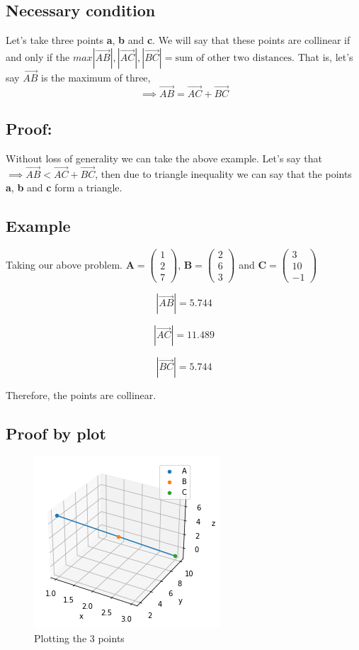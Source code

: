 \documentclass[journal,12pt,twocolumn]{IEEEtran}
\begin{document}
\subsection{Necessary condition}
Let's take three points \textbf{a}, \textbf{b} and \textbf{c}. We will say that these points are collinear if and only if the $max{|\overrightarrow{AB}|, |\overrightarrow{AC}|, |\overrightarrow{BC}|} = 
\text{sum of other two distances}$. That is, let's say $\overrightarrow{AB}$ is the maximum of three, 
$$\implies \overrightarrow{AB} = \overrightarrow{AC} + \overrightarrow{BC}$$
\subsection{Proof:}
Without loss of generality we can take the above example. Let's say that $\implies \overrightarrow{AB} < \overrightarrow{AC} + \overrightarrow{BC}$, then due to triangle inequality we can say that 
the points \textbf{a}, \textbf{b} and \textbf{c} form a triangle.

\subsection{Example}
Taking our above problem.
 $\textbf{A} = \begin{pmatrix} 1 \\ 2 \\ 7 \end{pmatrix}$, $\textbf{B} = \begin{pmatrix} 2 \\ 6 \\ 3 
\end{pmatrix}$ and $\textbf{C} = \begin{pmatrix} 3 \\ 10 \\ -1 \end{pmatrix}$

\begin{equation}
    |\overrightarrow{AB}| = 5.744
\end{equation}

\begin{equation}
    |\overrightarrow{AC}| = 11.489
\end{equation}

\begin{equation}
    |\overrightarrow{BC}| = 5.744
\end{equation}

Therefore, the points are collinear.

\subsection{Proof by plot}
\begin{figure}[ht]
    \centering
    \includegraphics[scale=0.5]{figs/pointsCollinear.png}
    \caption{Plotting the 3 points}
    \label{fig:collinearPoints}
\end{figure}
\end{document}
